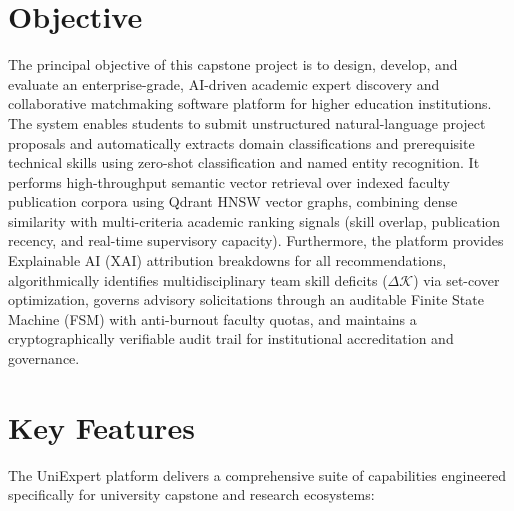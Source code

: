 \section{Objective}
\label{sec:objective}

The principal objective of this capstone project is to design, develop, and evaluate an enterprise-grade, AI-driven academic expert discovery and collaborative matchmaking software platform for higher education institutions. The system enables students to submit unstructured natural-language project proposals and automatically extracts domain classifications and prerequisite technical skills using zero-shot classification and named entity recognition. It performs high-throughput semantic vector retrieval over indexed faculty publication corpora using Qdrant HNSW vector graphs, combining dense similarity with multi-criteria academic ranking signals (skill overlap, publication recency, and real-time supervisory capacity). Furthermore, the platform provides Explainable AI (XAI) attribution breakdowns for all recommendations, algorithmically identifies multidisciplinary team skill deficits ($\Delta\mathcal{K}$) via set-cover optimization, governs advisory solicitations through an auditable Finite State Machine (FSM) with anti-burnout faculty quotas, and maintains a cryptographically verifiable audit trail for institutional accreditation and governance.

\section{Key Features}
\label{sec:key_features}

The UniExpert platform delivers a comprehensive suite of capabilities engineered specifically for university capstone and research ecosystems:

